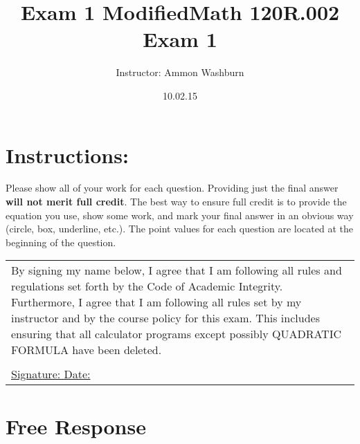 \documentclass[fleqn]{article}
\title{Exam 1 Modified}
\renewcommand{\thispagestyle}[1]{}
\begin{document}
\title{Math 120R.002 Exam 1}
\author{Instructor: Ammon Washburn}
\date{10.02.15}
\maketitle

\section*{Instructions:} 
Please show all of your work for each question. Providing just the final answer \textbf{will not merit full credit}. The best way to ensure full credit is to provide the equation you use, show some work, and mark your final answer in an obvious way (circle, box, underline, etc.). The point values for each question are located at the beginning of the question.

\vspace{1in} 

\begin{tabular}{|p{6.5in}|} 
\hline 
\noindent By signing my name below, I agree that I am following all rules and regulations set forth by the Code of Academic Integrity.  Furthermore, I agree that I am following all rules set by my instructor and by the course policy for this exam.  This includes ensuring that all calculator programs except possibly QUADRATIC FORMULA have been deleted.\\
\vspace{.3 in}\\
\underline{Signature:	\hspace{2.5 in}	Date:\hspace{1.25 in}}\\
\hline 
\end{tabular} 

\pagebreak
\thispagestyle{fancy}{
\lhead{}
}

\section*{Free Response}
\end{document}
